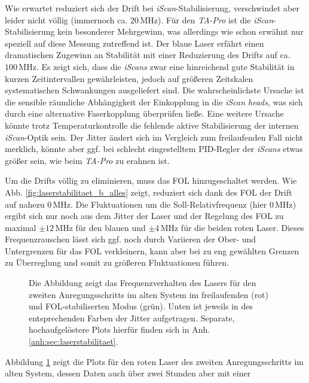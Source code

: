 Wie erwartet reduziert sich der Drift bei \textit{iScan}-Stabilisierung,
verschwindet aber leider nicht völlig (immernoch ca. $20\,$MHz). Für den \textit{TA-Pro} ist die
\textit{iScan}-Stabilisierung kein besonderer Mehrgewinn, was allerdings wie
schon erwähnt nur speziell auf diese Messung zutreffend ist. Der blaue Laser
erfährt einen dramatischen Zugewinn an Stabilität mit einer Reduzierung des
Drifts auf ca. $100\,$MHz. Es zeigt sich, dass die \textit{iScans} zwar
eine hinreichend gute Stabilität in kurzen Zeitintervallen gewährleisten, jedoch
auf größeren Zeitskalen systematischen Schwankungen ausgeliefert sind. Die
wahrscheinlichste Ursache ist die sensible räumliche Abhängigkeit der
Einkopplung in die \textit{iScan heads}, was sich durch eine alternative
Faserkopplung überprüfen ließe. Eine weitere Ursache könnte trotz
Temperaturkontrolle die fehlende aktive Stabilisierung der internen \textit{iScan}-Optik sein. Der
Jitter ändert sich im Vergleich zum freilaufenden Fall nicht merklich, könnte
aber ggf. bei schlecht eingestelltem PID-Regler der \textit{iScans} etwas größer
sein, wie beim \textit{TA-Pro} zu erahnen ist.\par
Um die Drifts völlig zu eliminieren, muss das FOL hinzugeschaltet werden. Wie
Abb. \ref{fig:laserstabilitaet_b_alles} zeigt, reduziert sich
dank des FOL der Drift auf nahezu $0\,$MHz. Die Fluktuationen um die
Soll-Relativfrequenz (hier $0\,$MHz) ergibt sich nur noch aus dem Jitter der
Laser und der Regelung des FOL zu maximal $\pm12\,$MHz für den blauen und
$\pm4\,$MHz für die beiden roten Laser. Dieses Frequenzrauschen lässt sich ggf.
noch durch Variieren der Ober- und Untergrenzen für das FOL verkleinern, kann aber bei zu eng
gewählten Grenzen zu Überreglung und somit zu größeren Fluktuationen führen.\par
\begin{figure}[h]
 	\centering
 	\footnotesize
	
	\caption[Laserfrequenzverhalten altes System]{Die Abbildung zeigt das
	Frequenzverhalten des Lasers für den zweiten Anregungsschritts im alten System
	im freilaufenden (rot) und FOL-stabiliserten Modus (grün).
	Unten ist jeweils in des entsprechenden Farben der Jitter aufgetragen.
	Separate, hochaufgelöstere Plots hierfür finden sich in Anh.
	\ref{anh:sec:laserstabilitaet}.}
	\label{fig:laserstabilitaet_alt_alles}
\end{figure}
Abbildung \ref{fig:laserstabilitaet_alt_alles} zeigt die Plots für den
roten Laser des zweiten Anregungsschritts im alten System, dessen Daten auch über zwei Stunden aber mit einer

